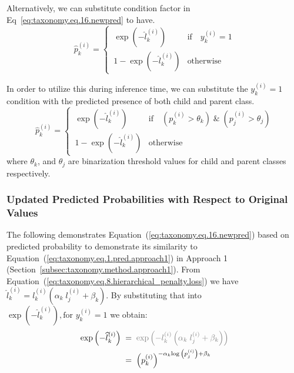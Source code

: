 \documentclass[final,1p,times,authoryear]{elsarticle}
\begin{document}
Alternatively, we can substitute condition factor in Eq~\ref{eq:taxonomy.eq.16.newpred} to have.
\begin{equation}
    \label{eq:taxonomy.loss.newpred_based_on_loss}
    \widehat{p}_k^{(i)} =
    \begin{cases}
        \, \exp(-\widehat{l}_k^{(i)})
        &
        \text{if} \quad y_{k}^{(i)}=1
        \\
        \, 1 - \exp(-\widehat{l}_k^{(i)})
        &
        \text{otherwise}
    \end{cases}
\end{equation}

In order to utilize this during inference time, we can substitute the $y_{k}^{(i)}=1$ condition with the predicted presence of both child and parent class.
\begin{equation}
    \label{eq:taxonomy.loss.newpred_based_on_loss_inference}
    \widehat{p}_k^{(i)} =
    \begin{cases}
        \, \exp(-\widehat{l}_k^{(i)})
        &
        \text{if} \quad (p_k^{(i)} > \theta_k) \; \& \; (p_j^{(i)} > \theta_j)
        \\
        \, 1 - \exp(-\widehat{l}_k^{(i)})
        &
        \text{otherwise}
    \end{cases}
\end{equation}
where $\theta_k$, and $\theta_j$ are binarization threshold values for child and parent classes respectively.

\subsubsection{Updated Predicted Probabilities with Respect to Original Values}
The following demonstrates Equation~(\ref{eq:taxonomy.eq.16.newpred}) based on predicted probability to demonstrate its similarity to Equation~(\ref{eq:taxonomy.eq.1.pred.approach1}) in Approach 1 (Section~\ref{subsec:taxonomy.method.approach1}). From Equation~(\ref{eq:taxonomy.eq.8.hierarchical_penalty.loss}) we have $\hat{l}_k^{(i)}=l_k^{(i)}\left(\alpha_k\;l_j^{(i)}+\beta_k\right) $. By substituting that into $\exp{\left(-\widehat{l}_{k}^{(i)}\right)}, \text{for } y_{k}^{(i)}=1 $ we obtain:
\begin{align}
    \label{eq:taxonomy.eq.17}
    \exp{\left(-{\widehat l}_k^{(i)}\right)}
    & \; = \; \textcolor{gray}{\exp{\left(-l_k^{(i)}\left(\alpha_k \; l_j^{(i)}+\beta_k\right)\right)}}
    \\
    & \; = \; {\left(p_k^{(i)}\right)}^{-\alpha_k{\log{\left(p_j^{(i)}\right)}}+\beta_k}
\end{align}
\end{document}
